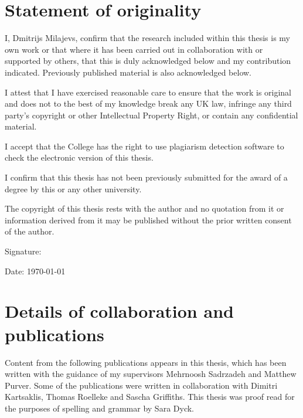 \chapter*{Statement of originality}

I, Dmitrijs Milajevs, confirm that the research included within this thesis is my own work or that where it has been carried out in collaboration with or supported by others, that this is duly acknowledged below and my contribution indicated. Previously published material is also acknowledged below.

I attest that I have exercised reasonable care to ensure that the work is original and does not to the best of my knowledge break any UK law, infringe any third party’s copyright or other Intellectual Property Right, or contain any confidential material.

I accept that the College has the right to use plagiarism detection software to check the electronic version of this thesis.

I confirm that this thesis has not been previously submitted for the award of a degree by this or any other university.

The copyright of this thesis rests with the author and no quotation from it or information derived from it may be published without the prior written consent of the author.

Signature:

Date: \today

\chapter*{Details of collaboration and publications}

Content from the following publications appears in this thesis, which has been written with the guidance of my supervisors Mehrnoosh Sadrzadeh and Matthew Purver. Some of the publications were written in collaboration with Dimitri Kartsaklis, Thomas Roelleke and Sascha Griffiths. This thesis was proof read for the purposes of spelling and grammar by Sara Dyck.

